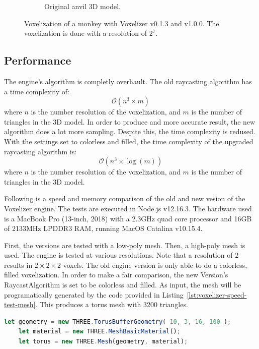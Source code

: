 \begin{figure}[hp!]
\begin{subfigure}[b]{0.7\textwidth}
        \caption{Original anvil 3D model.}
        \label{fig:result-original-anvil}
    \end{subfigure}
    \hfill
    \caption{Voxelization of a monkey with Voxelizer v0.1.3 and v1.0.0. The voxelization is done with a resolution of $2^7$.}
    \label{fig:result-voxelizer-comparison-anvil}
\end{figure}
\clearpage
\subsection{Performance}
The engine's algorithm is completly overhault. The old raycasting algorithm has a time complexity of:
\[ \mathcal{O}(n^3\times m) \]
where $n$ is the number resolution of the voxelization, and $m$ is the number of triangles in the 3D model. In order to produce and more accurate result, the new algorithm does a lot more sampling. Despite this, the time complexity is redused. With the settings set to colorless and filled, the time complexity of the upgraded raycasting algorithm is:
\[ \mathcal{O}(n^3\times \log(m)) \]
where $n$ is the number resolution of the voxelization, and $m$ is the number of triangles in the 3D model.

Following is a speed and memory comparison of the old and new vesion of the Voxelizer engine. The tests are executed in Node.js v12.16.3. The hardware used is a MacBook Pro (13-inch, 2018) with a 2.3GHz quad core processor and 16GB of 2133MHz LPDDR3 RAM, running MacOS Catalina v10.15.4.

First, the versions are tested with a low-poly mesh. Then, a high-poly mesh is used. The engine is tested at various resolutions. Note that a resolution of $2$ results in $2\times2\times2$ voxels. The old engine version is only able to do a colorless, filled voxelization. In order to make a fair comparison, the new Version's RaycastAlgorithm is set to be colorless and filled. As input, the mesh will be programatically generated by the code provided in Listing~\ref{lst:voxelizer-speed-test-mesh}. This produces a torus mesh with 3200 triangles.
\begin{lstlisting}[language=JavaScript,caption={JS code for generating low-detailed torus mesh.},label={lst:voxelizer-speed-test-mesh}]
    let geometry = new THREE.TorusBufferGeometry( 10, 3, 16, 100 );
    let material = new THREE.MeshBasicMaterial();
    let torus = new THREE.Mesh(geometry, material);
\end{lstlisting}

